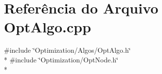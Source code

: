 \section{Referência do Arquivo Opt\+Algo.\+cpp}
\label{_opt_algo_8cpp}
{\ttfamily \#include \char`\"{}Optimization/\+Algos/\+Opt\+Algo.\+h\char`\"{}}\\*
{\ttfamily \#include \char`\"{}Optimization/\+Opt\+Node.\+h\char`\"{}}\\*

